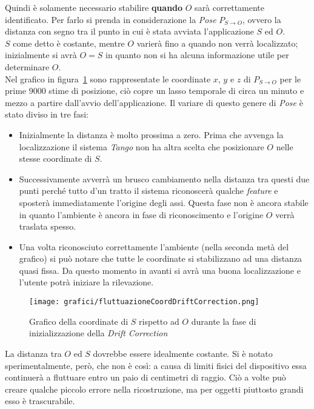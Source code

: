 Quindi è solamente necessario stabilire \textbf{quando} $O$ sarà correttamente identificato. Per farlo si prenda in considerazione la \emph{Pose} $P_{S \rightarrow O}$, ovvero la distanza con segno tra il punto in cui è stata avviata l'applicazione $S$ ed $O$.\\
$S$ come detto è costante, mentre $O$ varierà fino a quando non verrà localizzato; inizialmente si avrà $O = S$ in quanto non si ha alcuna informazione utile per determinare $O$.\\
Nel grafico in figura~\ref{figure:grafico_variazioni_pose} sono rappresentate le coordinate $x$, $y$ e $z$ di $P_{S \rightarrow O}$ per le prime 9000 stime di posizione, ciò copre un lasso temporale di circa un minuto e mezzo a partire dall'avvio dell'applicazione.
Il variare di questo genere di \emph{Pose} è stato diviso in tre fasi:
\begin{itemize}
	\item Inizialmente la distanza è molto prossima a zero. Prima che avvenga la localizzazione il sistema \emph{Tango} non ha altra scelta che posizionare $O$ nelle stesse coordinate di $S$.
	\item Successivamente avverrà un brusco cambiamento nella distanza tra questi due punti perché tutto d'un tratto il sistema riconoscerà qualche \emph{feature} e sposterà immediatamente l'origine degli assi. Questa fase non è  ancora stabile in quanto l'ambiente è ancora in fase di riconoscimento e l'origine $O$ verrà traslata spesso.
	\item Una volta riconosciuto correttamente l'ambiente (nella seconda metà del grafico) si può notare che tutte le coordinate si stabilizzano ad una distanza quasi fissa. Da questo momento in avanti si avrà una buona localizzazione e l'utente potrà iniziare la rilevazione.
\end{itemize}
\begin{figure}[H] 
    \centering 
    \texttt{[image: grafici/fluttuazioneCoordDriftCorrection.png]} 
    \caption{Grafico della coordinate di $S$ rispetto ad $O$ durante la fase di inizializzazione della \emph{Drift Correction}}
    \label{figure:grafico_variazioni_pose}
\end{figure}
La distanza tra $O$ ed $S$ dovrebbe essere idealmente costante. Si è notato sperimentalmente, però, che non è così: a causa di limiti fisici del dispositivo essa continuerà a fluttuare entro un paio di centimetri di raggio. Ciò a volte può creare qualche piccolo errore nella ricostruzione, ma per oggetti piuttosto grandi esso è trascurabile.

